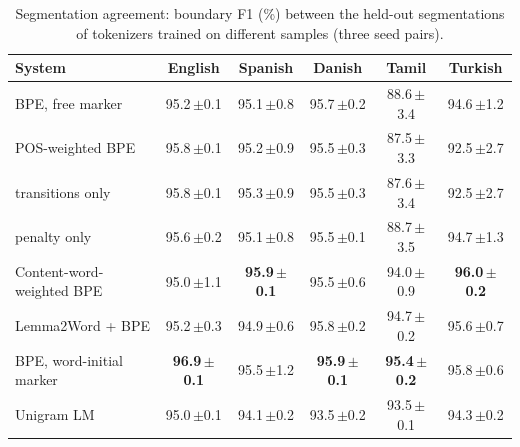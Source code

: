 \begin{table}[!ht]
\centering
\caption{Segmentation agreement: boundary F1 (\%) between the held-out segmentations of tokenizers trained on different samples (three seed pairs).}
\label{tab:agreement}
\small
\setlength{\tabcolsep}{4pt}
\begin{tabular}{lccccc}
\toprule
System & English & Spanish & Danish & Tamil & Turkish \\
\midrule
BPE, free marker & 95.2\,{\scriptsize$\pm$0.1} & 95.1\,{\scriptsize$\pm$0.8} & 95.7\,{\scriptsize$\pm$0.2} & 88.6\,{\scriptsize$\pm$3.4} & 94.6\,{\scriptsize$\pm$1.2} \\
POS-weighted BPE & 95.8\,{\scriptsize$\pm$0.1} & 95.2\,{\scriptsize$\pm$0.9} & 95.5\,{\scriptsize$\pm$0.3} & 87.5\,{\scriptsize$\pm$3.3} & 92.5\,{\scriptsize$\pm$2.7} \\
\quad transitions only & 95.8\,{\scriptsize$\pm$0.1} & 95.3\,{\scriptsize$\pm$0.9} & 95.5\,{\scriptsize$\pm$0.3} & 87.6\,{\scriptsize$\pm$3.4} & 92.5\,{\scriptsize$\pm$2.7} \\
\quad penalty only & 95.6\,{\scriptsize$\pm$0.2} & 95.1\,{\scriptsize$\pm$0.8} & 95.5\,{\scriptsize$\pm$0.1} & 88.7\,{\scriptsize$\pm$3.5} & 94.7\,{\scriptsize$\pm$1.3} \\
\addlinespace[2pt]
Content-word-weighted BPE & 95.0\,{\scriptsize$\pm$1.1} & \textbf{95.9\,{\scriptsize$\pm$0.1}} & 95.5\,{\scriptsize$\pm$0.6} & 94.0\,{\scriptsize$\pm$0.9} & \textbf{96.0\,{\scriptsize$\pm$0.2}} \\
Lemma2Word + BPE & 95.2\,{\scriptsize$\pm$0.3} & 94.9\,{\scriptsize$\pm$0.6} & 95.8\,{\scriptsize$\pm$0.2} & 94.7\,{\scriptsize$\pm$0.2} & 95.6\,{\scriptsize$\pm$0.7} \\
BPE, word-initial marker & \textbf{96.9\,{\scriptsize$\pm$0.1}} & 95.5\,{\scriptsize$\pm$1.2} & \textbf{95.9\,{\scriptsize$\pm$0.1}} & \textbf{95.4\,{\scriptsize$\pm$0.2}} & 95.8\,{\scriptsize$\pm$0.6} \\
Unigram LM & 95.0\,{\scriptsize$\pm$0.1} & 94.1\,{\scriptsize$\pm$0.2} & 93.5\,{\scriptsize$\pm$0.2} & 93.5\,{\scriptsize$\pm$0.1} & 94.3\,{\scriptsize$\pm$0.2} \\
\bottomrule
\end{tabular}
\end{table}

